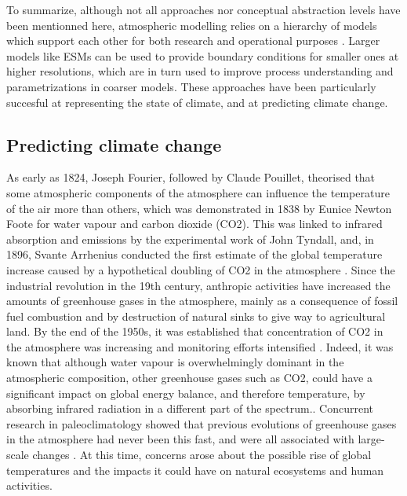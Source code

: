 To summarize, although not all approaches nor conceptual abstraction levels have been mentionned here, atmospheric modelling relies on a hierarchy of models which support each other for both research and operational purposes \citep{maher_model_2019}. Larger models like ESMs can be used to provide boundary conditions for smaller ones at higher resolutions, which are in turn used to improve process understanding and parametrizations in coarser models.
These approaches have been particularly succesful at representing the state of climate, and at predicting climate change.

\subsection{Predicting climate change}
As early as 1824, Joseph Fourier, followed by Claude Pouillet, theorised that some atmospheric components of the atmosphere can influence the temperature of the air more than others, which was demonstrated in 1838 by Eunice Newton Foote for water vapour and carbon dioxide (CO2). This was linked to infrared absorption and emissions by the experimental work of John Tyndall, and, in 1896, Svante Arrhenius conducted the first estimate of the global temperature increase caused by a hypothetical doubling of CO2 in the atmosphere \citep{frs_xxiii_1861,arrhenius_xxxi_1896}.
Since the industrial revolution in the 19th century, anthropic activities have increased the amounts of greenhouse gases in the atmosphere, mainly as a consequence of fossil fuel combustion and by destruction of natural sinks to give way to agricultural land.
By the end of the 1950s, it was established that concentration of CO2 in the atmosphere was increasing and monitoring efforts intensified \citep{pales_concentration_1965}.
Indeed, it was known that although water vapour is overwhelmingly dominant in the atmospheric composition, other greenhouse gases such as CO2, could have a significant impact on global energy balance, and therefore temperature, by absorbing infrared radiation in a different part of the spectrum.\citep{plass_carbon_2024}.
Concurrent research in paleoclimatology showed that previous evolutions of greenhouse gases in the atmosphere had never been this fast, and were all associated with large-scale changes \citep{lorius_30000-yr_1979}.
At this time, concerns arose about the possible rise of global temperatures and the impacts it could have on natural ecosystems and human activities.\citep{broecker_climatic_1975}

